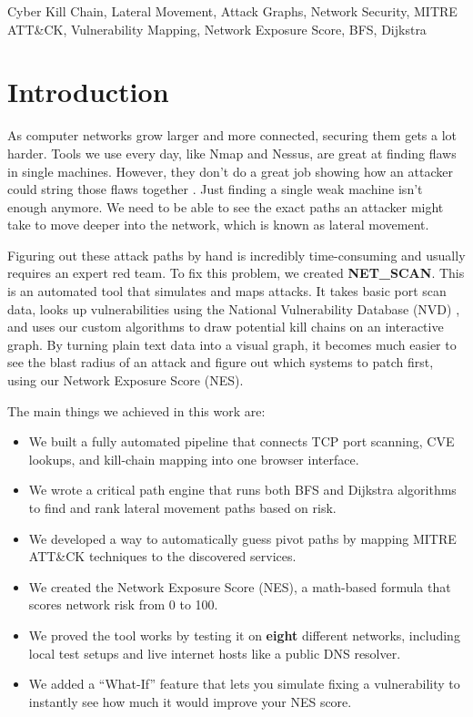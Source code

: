 \documentclass[conference]{IEEEtran}
\begin{document}
\begin{IEEEkeywords}
Cyber Kill Chain, Lateral Movement, Attack Graphs, Network Security, MITRE ATT\&CK, Vulnerability Mapping, Network Exposure Score, BFS, Dijkstra
\end{IEEEkeywords}

\section{Introduction}
As computer networks grow larger and more connected, securing them gets a lot harder. Tools we use every day, like Nmap and Nessus, are great at finding flaws in single machines. However, they don't do a great job showing how an attacker could string those flaws together \cite{nmap_ref, nessus_ref}. Just finding a single weak machine isn't enough anymore. We need to be able to see the exact paths an attacker might take to move deeper into the network, which is known as lateral movement.

Figuring out these attack paths by hand is incredibly time-consuming and usually requires an expert red team. To fix this problem, we created \textbf{NET\_SCAN}. This is an automated tool that simulates and maps attacks. It takes basic port scan data, looks up vulnerabilities using the National Vulnerability Database (NVD) \cite{nvd_ref}, and uses our custom algorithms to draw potential kill chains on an interactive graph. By turning plain text data into a visual graph, it becomes much easier to see the blast radius of an attack and figure out which systems to patch first, using our Network Exposure Score (NES).

The main things we achieved in this work are:
\begin{itemize}
    \item We built a fully automated pipeline that connects TCP port scanning, CVE lookups, and kill-chain mapping into one browser interface.
    \item We wrote a critical path engine that runs both BFS and Dijkstra algorithms to find and rank lateral movement paths based on risk.
    \item We developed a way to automatically guess pivot paths by mapping MITRE ATT\&CK techniques to the discovered services.
    \item We created the Network Exposure Score (NES), a math-based formula that scores network risk from 0 to 100.
    \item We proved the tool works by testing it on \textbf{eight} different networks, including local test setups and live internet hosts like a public DNS resolver.
    \item We added a ``What-If'' feature that lets you simulate fixing a vulnerability to instantly see how much it would improve your NES score.
\end{itemize}
\end{document}
